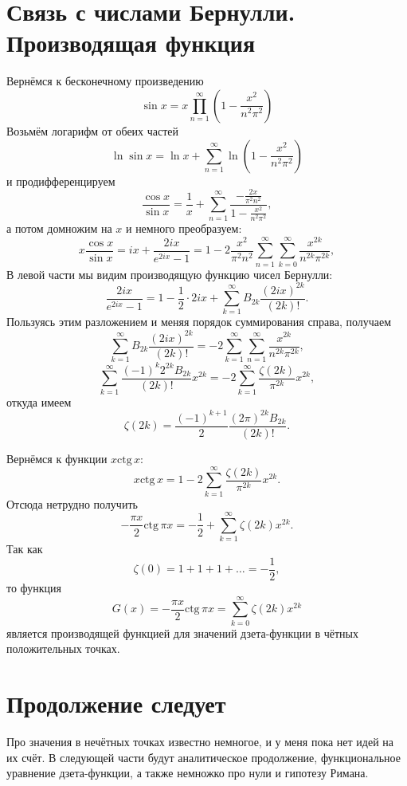 \documentclass{ncc}
\begin{document}
\section{Связь с числами Бернулли. Производящая функция}
Вернёмся к бесконечному произведению
\[
    \sin x = x\prod\limits_{n=1}^\infty\left(1-\frac{x^2}{n^2\pi^2}\right)
\]
Возьмём логарифм от обеих частей
\[
    \ln\sin x = \ln x + \sum\limits_{n=1}^\infty \ln\left(1-\frac{x^2}{n^2\pi^2}\right)
\]
и продифференцируем
\[
    \frac{\cos x}{\sin x} = \frac{1}{x} + \sum\limits_{n=1}^\infty \frac{-\frac{2 x}{\pi^2 n^2}}{1-\frac{x^2}{n^2\pi^2}},
\]
а потом домножим на \( x \) и немного преобразуем:
\[
     x\frac{\cos x}{\sin x} = ix + \frac{2ix}{e^{2ix}-1} = 1 -2\frac{x^2}{\pi^2 n^2}\sum\limits_{n=1}^\infty\sum\limits_{k=0}^\infty \frac{x^{2k}}{n^{2k}\pi^{2k}},
\]
В левой части мы видим производящую функцию чисел Бернулли:
\[
    \frac{2ix}{e^{2ix}-1} = 1 - \frac{1}{2}\cdot 2ix + \sum\limits_{k=1}^\infty B_{2k}\frac{(2ix)^{2k}}{(2k)!}.
\]
Пользуясь этим разложением и меняя порядок суммирования справа, получаем
\[
      \sum\limits_{k=1}^\infty B_{2k}\frac{(2ix)^{2k}}{(2k)!}= -2\sum\limits_{k=1}^\infty\sum\limits_{n=1}^\infty \frac{x^{2k}}{n^{2k}\pi^{2k}},
\]
\[
      \sum\limits_{k=1}^\infty \frac{(-1)^k2^{2k}B_{2k}}{(2k)!}x^{2k}= -2\sum\limits_{k=1}^\infty \frac{\zeta(2k)}{\pi^{2k}}x^{2k},
\]
откуда имеем
\[
    \zeta(2k) = \frac{(-1)^{k+1}}{2}\frac{(2\pi)^{2k}B_{2k}}{(2k)!}.
\]

Вернёмся к функции \( x\mathrm{ctg\,} x \):
\[
    x\mathrm{ctg\,} x = 1 - 2\sum\limits_{k=1}^\infty \frac{\zeta(2k)}{\pi^{2k}}x^{2k}.
\]
Отсюда нетрудно получить
\[
    -\frac{\pi x}{2}\mathrm{ctg\,}\pi x = -\frac{1}{2} + \sum\limits_{k=1}^\infty \zeta(2k)x^{2k}.
\]
Так как 
\[
    \zeta(0) = 1 + 1 + 1 + \ldots = -\frac{1}{2},
\]
то функция
\[
    G(x) = -\frac{\pi x}{2}\mathrm{ctg\,}\pi x = \sum\limits_{k=0}^\infty \zeta(2k)x^{2k}
\]
является производящей функцией для значений дзета-функции в чётных положительных точках.

\section{Продолжение следует}

Про значения в нечётных точках известно немногое, и у меня пока нет идей на их счёт. В следующей части будут аналитическое продолжение, функциональное уравнение дзета-функции, а также немножко про нули и гипотезу Римана.
\end{document}
